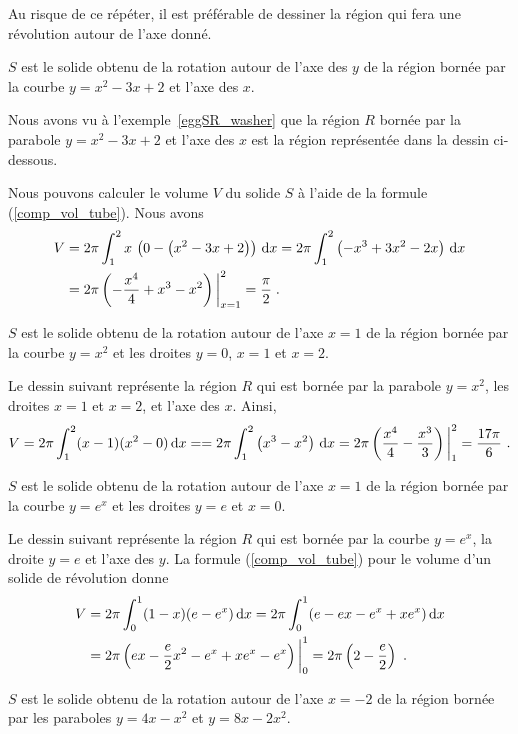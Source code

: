 {\begin{egg}
Au risque de ce répéter, il est préférable de dessiner la région qui fera
une révolution autour de l'axe donné.

 $S$ est le solide obtenu de la rotation autour de l'axe des $y$ de
la région bornée par la courbe $y=x^2-3x+2$ et l'axe des $x$.

Nous avons vu à l'exemple~\ref{eggSR_washer} que la région
$R$ bornée par la parabole $y=x^2-3x+2$ et l'axe des $x$ est la région
représentée dans la dessin ci-dessous.

Nous pouvons calculer le volume $V$ du solide $S$ à l'aide de la formule
(\ref{comp_vol_tube}).  Nous avons
\begin{align*}
V &= 2 \pi \int_1^2 x \, \left( 0 - \left(x^2-3x+2\right)\right) \,\mathrm{d}x =
2\pi \int_1^2 \left( -x^3 + 3x^2 - 2x \right) \,\mathrm{d}x \\
&= 2\pi \left( -\frac{x^4}{4} + x^3 - x^2 \right)\bigg|_{x=1}^2 =
\frac{\pi}{2} \; .
\end{align*}

 $S$ est le solide obtenu de la rotation autour de l'axe $x=1$ de la
région bornée par la courbe $y=x^2$ et les droites $y=0$, $x=1$ et $x=2$.

Le dessin suivant représente la région $R$ qui est bornée par la
parabole $y=x^2$, les droites $x=1$ et $x=2$, et l'axe des $x$.
Ainsi,
\[
V = 2\pi \int_1^2 (x-1) (x^2-0) \,\mathrm{d}x =
= 2 \pi \int_1^2 \left( x^3 - x^2 \right)\,\mathrm{d}x
= 2\pi \left(\frac{x^4}{4} - \frac{x^3}{3} \right)\bigg|_1^2
= \frac{17 \pi}{6} \ . 
\]

 $S$ est le solide obtenu de la rotation autour de l'axe $x=1$ de la
région bornée par la courbe $y=e^x$ et les droites $y=e$ et $x=0$.

Le dessin suivant représente la région $R$ qui est bornée
par la courbe $y=e^x$, la droite $y=e$ et l'axe des $y$.
La formule (\ref{comp_vol_tube}) pour le volume d'un solide de révolution
donne
\begin{align*}
V &= 2\pi \int_0^1 (1-x) (e-e^x) \,\mathrm{d}x
= 2\pi \int_0^1 (e -e x - e^x + xe^x )\,\mathrm{d}x \\
&= 2\pi\left(ex- \frac{e}{2}x^2 - e^x + xe^x - e^x\right)\bigg|_0^1
= 2\pi\left(2-\frac{e}{2}\right) \ .
\end{align*}

 $S$ est le solide obtenu de la rotation autour de l'axe $x=-2$ de la
région bornée par les paraboles $y=4x-x^2$ et $y=8x-2x^2$.


\end{egg}}
